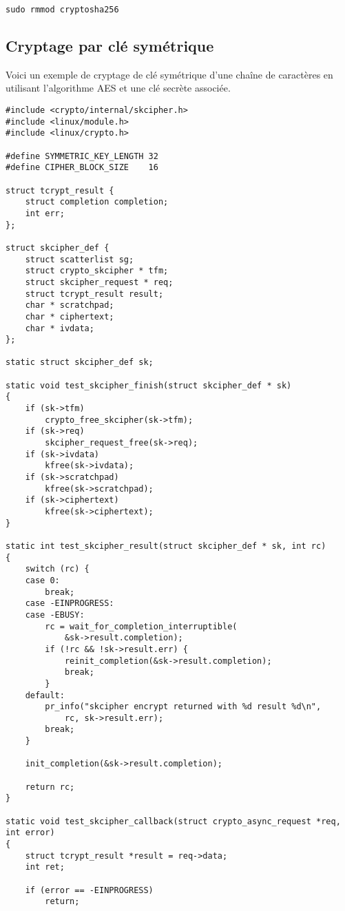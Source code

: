 \documentclass[11pt]{article}
\begin{document}
\begin{verbatim}
sudo rmmod cryptosha256
\end{verbatim}

\subsection*{Cryptage par clé symétrique}
\label{sec-16-2}

Voici un exemple de cryptage de clé symétrique d'une chaîne de caractères en utilisant l'algorithme AES et une clé secrète associée.

\begin{verbatim}
#include <crypto/internal/skcipher.h>
#include <linux/module.h>
#include <linux/crypto.h>

#define SYMMETRIC_KEY_LENGTH 32
#define CIPHER_BLOCK_SIZE    16

struct tcrypt_result {
    struct completion completion;
    int err;
};

struct skcipher_def {
    struct scatterlist sg;
    struct crypto_skcipher * tfm;
    struct skcipher_request * req;
    struct tcrypt_result result;
    char * scratchpad;
    char * ciphertext;
    char * ivdata;
};

static struct skcipher_def sk;

static void test_skcipher_finish(struct skcipher_def * sk)
{
    if (sk->tfm)
        crypto_free_skcipher(sk->tfm);
    if (sk->req)
        skcipher_request_free(sk->req);
    if (sk->ivdata)
        kfree(sk->ivdata);
    if (sk->scratchpad)
        kfree(sk->scratchpad);
    if (sk->ciphertext)
        kfree(sk->ciphertext);
}

static int test_skcipher_result(struct skcipher_def * sk, int rc)
{
    switch (rc) {
    case 0:
        break;
    case -EINPROGRESS:
    case -EBUSY:
        rc = wait_for_completion_interruptible(
            &sk->result.completion);
        if (!rc && !sk->result.err) {
            reinit_completion(&sk->result.completion);
            break;
        }
    default:
        pr_info("skcipher encrypt returned with %d result %d\n",
            rc, sk->result.err);
        break;
    }

    init_completion(&sk->result.completion);

    return rc;
}

static void test_skcipher_callback(struct crypto_async_request *req, int error)
{
    struct tcrypt_result *result = req->data;
    int ret;

    if (error == -EINPROGRESS)
        return;


\end{verbatim}
\end{document}
